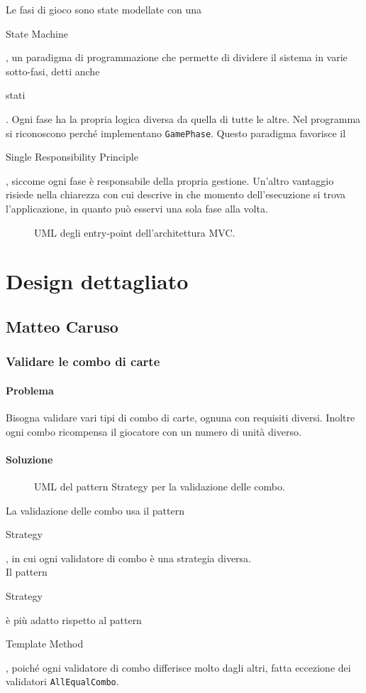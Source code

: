 \documentclass[a4paper,12pt]{report}
\begin{document}
Le fasi di gioco sono state modellate con una \begin{itshape}State Machine\end{itshape}, un paradigma di programmazione che permette di dividere il sistema in varie sotto-fasi, detti anche \begin{itshape}stati\end{itshape}. Ogni fase ha la propria logica diversa da quella di tutte le altre. Nel programma si riconoscono perché implementano \texttt{GamePhase}.
Questo paradigma favorisce il \begin{itshape}Single Responsibility Principle\end{itshape}, siccome ogni fase è responsabile della propria gestione.
Un'altro vantaggio risiede nella chiarezza con cui descrive in che momento dell'esecuzione si trova l'applicazione, in quanto può esservi una sola fase alla volta.
\pagebreak
\begin{figure}[H]
	\centering
	
	\caption{UML degli entry-point dell'architettura MVC.}
\end{figure}
\pagebreak

\section{Design dettagliato}
\subsection{Matteo Caruso}
\subsubsection{Validare le combo di carte}
\paragraph{Problema}
Bisogna validare vari tipi di combo di carte, ognuna con requisiti diversi. Inoltre ogni combo ricompensa il giocatore con un numero di unità diverso.
\paragraph{Soluzione}
\begin{figure}[H]
	\centering
	
	\caption{UML del pattern Strategy per la validazione delle combo.}
\end{figure}
La validazione delle combo usa il pattern \begin{itshape}Strategy\end{itshape}, in cui ogni validatore di combo è una strategia diversa.
\\
Il pattern \begin{itshape}Strategy\end{itshape} è più adatto rispetto al pattern \begin{itshape}Template Method\end{itshape}, poiché ogni validatore di combo differisce molto dagli altri, fatta eccezione dei validatori \texttt{AllEqualCombo}.
\end{document}
